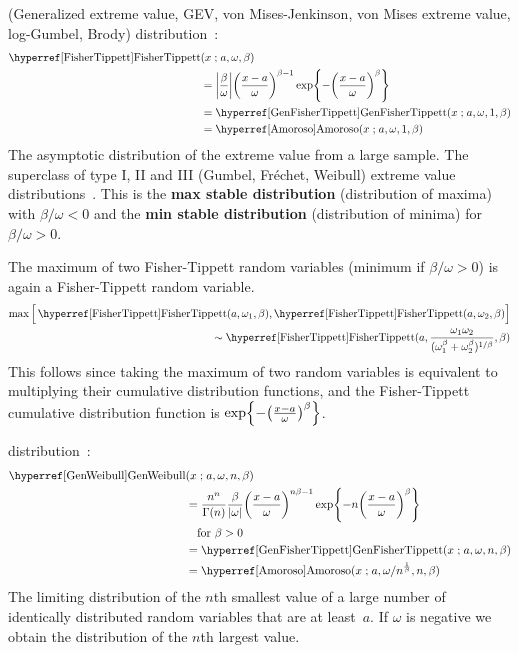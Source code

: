 
 (Generalized extreme value, GEV, von Mises-Jenkinson, von Mises extreme value, log-Gumbel, Brody) distribution~\cite{Fisher1928, Mises1936, Gumbel1958,Johnson1995,McFadden1978a}:
\begin{align}
\label{FisherTippett}
\opr{FisherTippett}&(x\given  a , \omega, \beta) 
\\ \notag
&=
\Left|\frac{\beta}{\omega}\Right|
\Left(\frac{x-a}{\omega}\Right)^{ \beta -1}
\exp \Left\{
-  \Left(\frac{x-a}{\omega}\Right)^{\beta} 
\Right\} \checked
\\ \notag & = \opr{GenFisherTippett}(x\given a, \omega, 1, \beta) \checked
\\ \notag & = \opr{Amoroso}(x\given a, \omega, 1, \beta) \checked
\end{align}
The asymptotic distribution of the extreme value from a large sample. The superclass of type I, II and III (Gumbel, Fr\'{e}chet, Weibull) extreme value distributions~\cite{Mises1936}.  This is the {\bf max stable distribution} (distribution of maxima) with $\beta/\omega<0$ and the {\bf min stable distribution}  (distribution of minima) for $\beta/\omega>0$.


The maximum of two Fisher-Tippett random variables (minimum if $\beta/\omega>0$)  is again a Fisher-Tippett random variable. 
\begin{align*}
\max\Big[ \opr{FisherTippett}(a,\omega_1,\beta),  \opr{FisherTippett}(a, \omega_2,\beta)  \Big]&\\  \sim 
 \opr{FisherTippett}(a, \frac{\omega_1 \omega_2}{(\omega_1^{\beta} + \omega_2^{\beta} )^{1/\beta}},\beta) \checked
\end{align*}
This follows since taking the maximum of two random variables is equivalent to multiplying their cumulative distribution functions, and the Fisher-Tippett cumulative distribution function is $\exp \Left\{
-  \Left(\frac{x-a}{\omega}\Right)^{\beta}
\Right\}$.



 distribution~\cite{Smirnov1949,Barndorff-Nielsen1963}:
\begin{align}
\label{GenWeibull}
\opr{GenWeibull}&(x \given a , \omega, n, \beta) 
\\ \notag &=	\frac{n^n}{\Gamma(n)}  \frac{ \beta}{| \omega |} \Left(\frac{x-a }{\omega}\Right)^{n \beta-1} \exp\Left\{-n \Left(\frac{x-a }{\omega}\Right)^{ \beta}\Right\} 
\\ \notag &\quad \text{for } \beta>0 
\\ \notag & = \opr{GenFisherTippett}(x\given a, \omega, n, \beta) \checked
\\ \notag
&= \opr{Amoroso}(x\given  a , {\omega}/{n^{\frac{1}{\beta} }}, n, \beta)  \checked
\end{align}
The limiting distribution of the $n$th smallest value of a large number of  identically distributed random variables that are at least~$a$. 
If $\omega$ is negative we obtain the distribution of the $n$th largest value.




